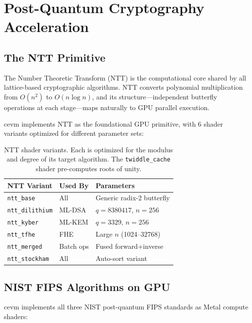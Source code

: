 \section{Post-Quantum Cryptography Acceleration}

\label{sec:pq}

\subsection{The NTT Primitive}

The Number Theoretic Transform (NTT) is the computational core shared by all lattice-based
cryptographic algorithms. NTT converts polynomial multiplication from $O(n^2)$ to
$O(n \log n)$, and its structure---independent butterfly operations at each stage---maps
naturally to GPU parallel execution.

cevm implements NTT as the foundational GPU primitive, with 6 shader variants optimized
for different parameter sets:

\begin{table}[h]
\centering
\small
\begin{tabular}{lll}
\toprule
\textbf{NTT Variant} & \textbf{Used By} & \textbf{Parameters} \\
\midrule
\texttt{ntt\_base}       & All         & Generic radix-2 butterfly \\
\texttt{ntt\_dilithium}  & ML-DSA      & $q = 8380417$, $n = 256$ \\
\texttt{ntt\_kyber}      & ML-KEM      & $q = 3329$, $n = 256$ \\
\texttt{ntt\_tfhe}       & FHE         & Large $n$ (1024--32768) \\
\texttt{ntt\_merged}     & Batch ops   & Fused forward+inverse \\
\texttt{ntt\_stockham}   & All         & Auto-sort variant \\
\bottomrule
\end{tabular}
\caption{NTT shader variants. Each is optimized for the modulus and degree of its
target algorithm. The \texttt{twiddle\_cache} shader pre-computes roots of unity.}
\label{tab:ntt}
\end{table}

\subsection{NIST FIPS Algorithms on GPU}

cevm implements all three NIST post-quantum FIPS standards as Metal compute shaders:

